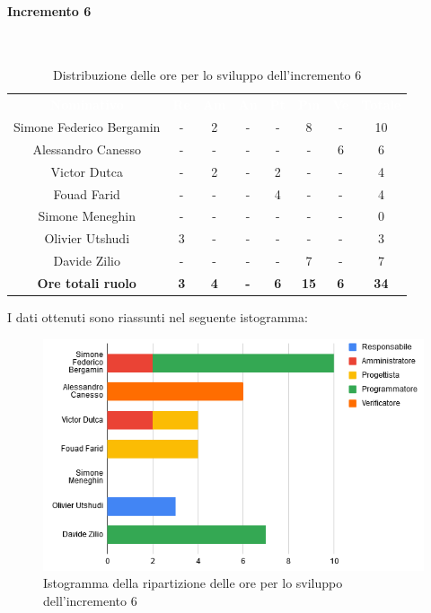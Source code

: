 \paragraph*{Incremento 6}\mbox{} \\
\begin{table}[H]
\centering\renewcommand{\arraystretch}{1.5}
\caption{Distribuzione delle ore per lo sviluppo dell'incremento 6}
\vspace{0.2cm}
\begin{tabular}{ c c c c c c c c }
\rowcolor{redafk}
\textcolor{white}{\textbf{Nominativo}} & \textcolor{white}{\textbf{Re}} &
\textcolor{white}{\textbf{Am}} & \textcolor{white}{\textbf{An}} &
\textcolor{white}{\textbf{Pt}} & \textcolor{white}{\textbf{Pm}} &
\textcolor{white}{\textbf{Ve}} & \textcolor{white}{\textbf{Totale}} \\
Simone Federico Bergamin & - & 2 & - & - & 8 & - & 10 \\
Alessandro Canesso & - & - & - & - & - & 6 & 6 \\
Victor Dutca & - & 2 & - & 2 & - & - & 4 \\
Fouad Farid & - & - & - & 4 & - & - & 4 \\
Simone Meneghin & - & - & - & - & - & - & 0 \\
Olivier Utshudi & 3 & - & - & - & - & - & 3 \\
Davide Zilio & - & - & - & - & 7 & - & 7 \\
\rowcolor{lastrowcolor}
\textbf{Ore totali ruolo} & \textbf{3} & \textbf{4} & \textbf{-} & \textbf{6} & \textbf{15} & \textbf{6} & \textbf{34} \\
\end{tabular}
\end{table}

I dati ottenuti sono riassunti nel seguente istogramma:
\begin{figure}[H]
\centering
\includegraphics[scale=0.60]{img/grafici/tabella_inc6.png}
\caption{Istogramma della ripartizione delle ore per lo sviluppo dell'incremento 6}
\end{figure}

